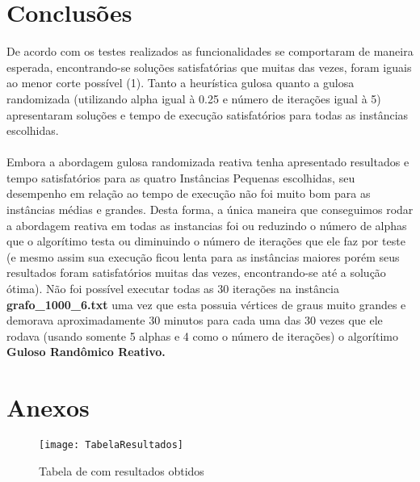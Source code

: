 \documentclass[a4paper, 12pt]{article}
\begin{document}
\section{Conclusões}
De acordo com os testes realizados as funcionalidades se comportaram de maneira esperada, encontrando-se soluções satisfatórias que muitas das vezes, foram iguais ao menor corte possível (1). Tanto a heurística gulosa quanto a gulosa randomizada (utilizando alpha igual à 0.25 e número de iterações igual à 5) apresentaram soluções e tempo de execução satisfatórios para todas as instâncias escolhidas.
\\ 
\\
\ident Embora a abordagem gulosa randomizada reativa tenha apresentado resultados e tempo satisfatórios para as 
quatro Instâncias Pequenas escolhidas, seu desempenho em relação ao tempo de execução não foi muito bom para as instâncias médias e grandes. Desta forma, a única maneira que conseguimos rodar a abordagem reativa em todas as instancias foi ou reduzindo o número de alphas que o algorítimo testa ou diminuindo o número de iterações que ele faz por teste (e mesmo assim sua execução ficou lenta para as instâncias maiores porém seus resultados foram satisfatórios muitas das vezes, encontrando-se até a solução ótima). Não foi possível executar todas as 30 iterações na instância \textbf{grafo\_1000\_6.txt} uma vez que esta possuia vértices de graus muito grandes e demorava aproximadamente 30 minutos para cada uma das 30 vezes que ele rodava (usando somente 5 alphas e 4 como o número de iterações) o algorítimo \textbf{Guloso Randômico Reativo.}

\section{Anexos}

  \begin{figure}[h]
    \centering
    \texttt{[image: TabelaResultados]}
    \caption{Tabela de com resultados obtidos }
  \end{figure}
\end{document}
